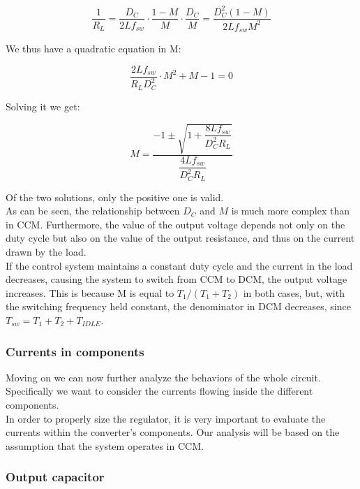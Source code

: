 \documentclass[../main.tex]{subfiles}
\begin{document}
\begin{equation}
	\frac{1}{R_L} = \frac{D_C}{2Lf_{sw}} \cdot \frac{1-M}{M} \cdot \frac{D_C}{M} = \frac{D^2_C(1-M)}{2Lf_{sw}M^2}
\end{equation}

We thus have a quadratic equation in M:

\begin{equation}
	\frac{2Lf_{sw}}{R_LD^2_C} \cdot M^2 + M - 1 = 0
\end{equation}

Solving it we get:

\begin{equation}
	M = \dfrac{-1 \pm \sqrt{1 + \dfrac{8Lf_{sw}}{D^2_CR_L}} }{\dfrac{4Lf_{sw}}{D^2_CR_L}}
\end{equation}

Of the two solutions, only the positive one is valid.\\

As can be seen, the relationship between $D_C$ and $M$ is much more complex than in CCM. Furthermore, the value of the output voltage depends not only on the duty cycle but also on the value of the output resistance, and thus on the current drawn by the load.\\

If the control system maintains a constant duty cycle and the current in the load decreases, causing the system to switch from CCM to DCM, the output
voltage increases. This is because M is equal to $T_1 /(T_1 + T_2)$ in both cases, but, with the switching frequency held constant, the denominator in DCM decreases, since $T_{sw} = T_1 + T_2 + T_{IDLE}$.


\subsubsection*{Currents in components}


Moving on we can now further analyze the behaviors of the whole circuit.
Specifically we want to consider the currents flowing inside the different components.\\

In order to properly size the regulator, it is very important to evaluate the currents within the converter’s components. Our analysis will be based on the assumption that the system operates in CCM.

\subsubsection*{Output capacitor}
\end{document}
